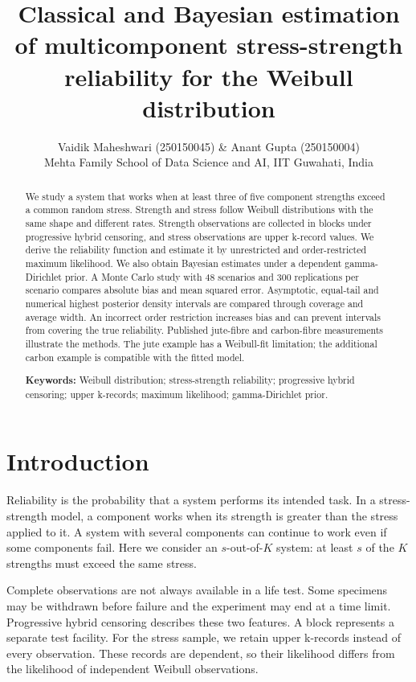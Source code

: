\documentclass[a4paper,11pt]{article}
\title{Classical and Bayesian estimation of multicomponent stress-strength reliability for the Weibull distribution}
\author{Vaidik Maheshwari (250150045) \& Anant Gupta (250150004)\\[4pt]\small Mehta Family School of Data Science and AI, IIT Guwahati, India}
\date{}
\begin{document}
\begin{singlespace}
\maketitle
\end{singlespace}
\begin{abstract}
We study a system that works when at least three of five component strengths exceed a common random stress. Strength and stress follow Weibull distributions with the same shape and different rates. Strength observations are collected in blocks under progressive hybrid censoring, and stress observations are upper k-record values. We derive the reliability function and estimate it by unrestricted and order-restricted maximum likelihood. We also obtain Bayesian estimates under a dependent gamma-Dirichlet prior. A Monte Carlo study with 48 scenarios and 300 replications per scenario compares absolute bias and mean squared error. Asymptotic, equal-tail and numerical highest posterior density intervals are compared through coverage and average width. An incorrect order restriction increases bias and can prevent intervals from covering the true reliability. Published jute-fibre and carbon-fibre measurements illustrate the methods. The jute example has a Weibull-fit limitation; the additional carbon example is compatible with the fitted model.

\textbf{Keywords:} Weibull distribution; stress-strength reliability; progressive hybrid censoring; upper k-records; maximum likelihood; gamma-Dirichlet prior.
\end{abstract}

\section{Introduction}\label{sec:introduction}
Reliability is the probability that a system performs its intended task. In a stress-strength model, a component works when its strength is greater than the stress applied to it. A system with several components can continue to work even if some components fail. Here we consider an $s$-out-of-$K$ system: at least $s$ of the $K$ strengths must exceed the same stress.

Complete observations are not always available in a life test. Some specimens may be withdrawn before failure and the experiment may end at a time limit. Progressive hybrid censoring describes these two features. A block represents a separate test facility. For the stress sample, we retain upper k-records instead of every observation. These records are dependent, so their likelihood differs from the likelihood of independent Weibull observations.
\end{document}
